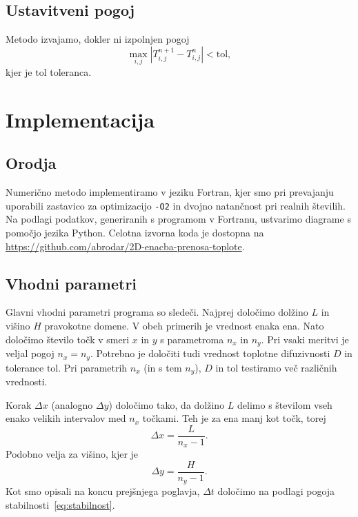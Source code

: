 \documentclass[a4paper,11pt]{article}
\begin{document}
	\subsection{Ustavitveni pogoj}
	
	Metodo izvajamo, dokler ni izpolnjen pogoj
	\begin{equation}
		\max_{i,j} \left| T^{n+1}_{i,j} - T^n_{i,j} \right| < \text{tol},
		\label{eq:ustavitev}
	\end{equation}
	kjer je $\text{tol}$ toleranca.
	
	\newpage
	
	\section{Implementacija}
	
	\subsection{Orodja}
	
	Numerično metodo implementiramo v jeziku Fortran, kjer smo pri prevajanju uporabili zastavico za optimizacijo \texttt{-O2} in dvojno natančnost pri realnih številih. Na podlagi podatkov, generiranih s programom v Fortranu, ustvarimo diagrame s pomočjo jezika Python. Celotna izvorna koda je dostopna na \url{https://github.com/abrodar/2D-enacba-prenosa-toplote}.
	
	\subsection{Vhodni parametri}
	
	Glavni vhodni parametri programa so sledeči. Najprej določimo dolžino $L$ in višino $H$ pravokotne domene. V obeh primerih je vrednost enaka ena. Nato določimo število točk v smeri $x$ in $y$ s parametroma $n_x$ in $n_y$. Pri vsaki meritvi je veljal pogoj $n_x = n_y$. Potrebno je določiti tudi vrednost toplotne difuzivnosti $D$ in tolerance $\text{tol}$. Pri parametrih $n_x$ (in s tem $n_y$), $D$ in $\text{tol}$ testiramo več različnih vrednosti.
	
	Korak $\Delta x$ (analogno $\Delta y$) določimo tako, da dolžino $L$ delimo s številom vseh enako velikih intervalov med $n_x$ točkami. Teh je za ena manj kot točk, torej
	\begin{equation}
		\Delta x = \frac{L}{n_x - 1}.
	\end{equation}
	Podobno velja za višino, kjer je
	\begin{equation}
		\Delta y = \frac{H}{n_y - 1}.
	\end{equation}
	Kot smo opisali na koncu prejšnjega poglavja, $\Delta t$ določimo na podlagi pogoja stabilnosti~\eqref{eq:stabilnost}.
	
\end{document}
